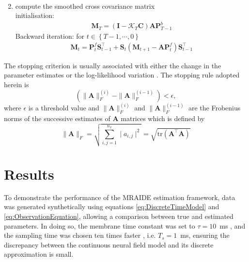 \documentclass[11pt,draftcls,onecolumn,peerreview]{IEEEtran}
\newcommand{\cut}[1]{\textcolor{cyan}{#1}}
\begin{document}
\begin{algorithm}
\begin{enumerate}
\begin{align}
 \end{align}
 \item compute the smoothed cross covariance matrix\\
 initialisation:
 \begin{align}
  \mathbf M_T=(\mathbf I-\mathcal K_T\mathbf C)\mathbf A\mathbf P_{T-1}^b \nonumber
 \end{align}
 Backward iteration: for $t\in\left\lbrace T-1,\cdots,0\right\rbrace $
 \begin{align}
 \mathbf M_t= \mathbf P_t^{f}\mathbf S_{t-1}^{\top}+\mathbf S_{t}(\mathbf M_{t+1}-\mathbf A\mathbf P_t^{f} )\mathbf S_{t-1}^{\top}\nonumber
 \end{align}
 \end{enumerate}
 \end{algorithm}
The stopping criterion is usually associated with either the change in the parameter estimates or the log-likelihood variation \cite{McLachlan1997}. The stopping rule adopted herein is
\begin{equation}
 \left(\parallel \mathbf{A} \parallel_{F}^{(i)}-\parallel \mathbf{A} \parallel_{F}^{(i-1)}\right)<\epsilon,
 \end{equation}
 where $\epsilon$ is a threshold value and $\parallel \mathbf{A} \parallel_{F}^{(i)}$ and $ \parallel \mathbf{A} \parallel_{F}^{(i-1)}$ are the Frobenius norms  of the successive estimates of $\mathbf{A} $ matrices which is defined by \cite{Meyer2000}
 \begin{equation}
  \parallel \mathbf{A} \parallel_{F}=\sqrt{\sum_{i,j=1}^{n_x}\mid a_{i,j} \mid^2}=\sqrt{\mathrm{tr} (\mathbf A^{\top}\mathbf A)}
 \end{equation}

\section{Results}\label{sec:MRA-results}
To demonstrate the performance of the MRAIDE estimation framework, data was generated synthetically  using equations \eqref{eq:DiscreteTimeModel} and \eqref{eq:ObservationEquation}, allowing a comparison between true and estimated parameters. In doing so, the membrane time constant was set to $\tau = 10$~ms \cite{David2003}, and the sampling time was chosen ten times faster \cite{Stephan2008}, i.e. $T_s = 1$~ms, ensuring the discrepancy between the continuous neural field model and its discrete approximation is small. 
\end{document}

